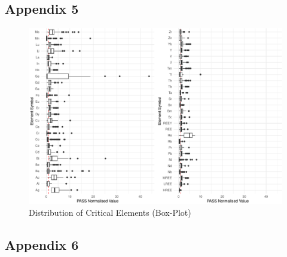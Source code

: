\documentclass[11pt,a4paper,]{article}
\begin{document}
\newpage

\subsection{Appendix 5}\label{sec-appendixfive}

\begin{figure}

{\centering \includegraphics[width=1\linewidth]{Final_report_files/figure-latex/element-dist-1} 

}

\caption{Distribution of Critical Elements (Box-Plot)}\label{fig:element-dist}
\end{figure}

\newpage

\subsection{Appendix 6}\label{sec-appendixsix}
\end{document}
